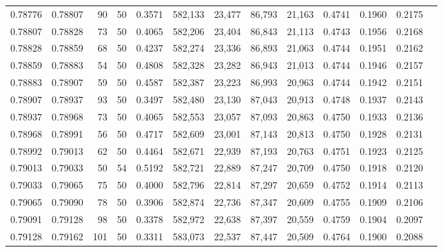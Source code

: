 \begin{tabular}{rrrrrrrrrrrrr}
0.78776 & 0.78807 &    90 &  50 &                                     0.3571 & 582,133 &  23,477 &  86,793 &  21,163 & 0.4741 & 0.1960 & 0.2175 \\
0.78807 & 0.78828 &    73 &  50 &                                     0.4065 & 582,206 &  23,404 &  86,843 &  21,113 & 0.4743 & 0.1956 & 0.2168 \\
0.78828 & 0.78859 &    68 &  50 &                                     0.4237 & 582,274 &  23,336 &  86,893 &  21,063 & 0.4744 & 0.1951 & 0.2162 \\
0.78859 & 0.78883 &    54 &  50 &                                     0.4808 & 582,328 &  23,282 &  86,943 &  21,013 & 0.4744 & 0.1946 & 0.2157 \\
0.78883 & 0.78907 &    59 &  50 &                                     0.4587 & 582,387 &  23,223 &  86,993 &  20,963 & 0.4744 & 0.1942 & 0.2151 \\
0.78907 & 0.78937 &    93 &  50 &                                     0.3497 & 582,480 &  23,130 &  87,043 &  20,913 & 0.4748 & 0.1937 & 0.2143 \\
0.78937 & 0.78968 &    73 &  50 &                                     0.4065 & 582,553 &  23,057 &  87,093 &  20,863 & 0.4750 & 0.1933 & 0.2136 \\
0.78968 & 0.78991 &    56 &  50 &                                     0.4717 & 582,609 &  23,001 &  87,143 &  20,813 & 0.4750 & 0.1928 & 0.2131 \\
0.78992 & 0.79013 &    62 &  50 &                                     0.4464 & 582,671 &  22,939 &  87,193 &  20,763 & 0.4751 & 0.1923 & 0.2125 \\
0.79013 & 0.79033 &    50 &  54 &                                     0.5192 & 582,721 &  22,889 &  87,247 &  20,709 & 0.4750 & 0.1918 & 0.2120 \\
0.79033 & 0.79065 &    75 &  50 &                                     0.4000 & 582,796 &  22,814 &  87,297 &  20,659 & 0.4752 & 0.1914 & 0.2113 \\
0.79065 & 0.79090 &    78 &  50 &                                     0.3906 & 582,874 &  22,736 &  87,347 &  20,609 & 0.4755 & 0.1909 & 0.2106 \\
0.79091 & 0.79128 &    98 &  50 &                                     0.3378 & 582,972 &  22,638 &  87,397 &  20,559 & 0.4759 & 0.1904 & 0.2097 \\
0.79128 & 0.79162 &   101 &  50 &                                     0.3311 & 583,073 &  22,537 &  87,447 &  20,509 & 0.4764 & 0.1900 & 0.2088 \\

\end{tabular}
